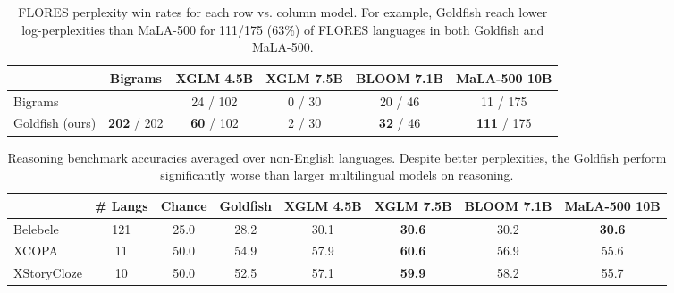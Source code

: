 \documentclass[11pt]{article}
\begin{document}
\setlength{\belowcaptionskip}{-0.1cm}
\begin{table}[t]
    \centering
    \footnotesize
    \renewcommand{\arraystretch}{1.3}
    \begin{tabular}{|p{2.0cm}|ccccc|}
        \cline{2-6}
        \multicolumn{1}{c|}{} &
        \multicolumn{1}{c|}{Bigrams} &
        \multicolumn{1}{c|}{XGLM 4.5B} &
        \multicolumn{1}{c|}{XGLM 7.5B} &
        \multicolumn{1}{c|}{BLOOM 7.1B} &
        \multicolumn{1}{c|}{MaLA-500 10B} \\ 
        \hline
        Bigrams & & 24 / 102 & 0 / 30 & 20 / 46 & 11 / 175 \\
        Goldfish (ours) & \textbf{202} / 202 & \textbf{60} / 102 & 2 / 30 & \textbf{32} / 46 & \textbf{111} / 175 \\
        \hline
    \end{tabular}
    \normalsize
    \caption{FLORES perplexity win rates for each row vs. column model. For example, Goldfish reach lower log-perplexities than MaLA-500 for 111/175 (63\%) of FLORES languages in both Goldfish and MaLA-500.}
    \label{tab:win-rates}
\end{table}
\setlength{\belowcaptionskip}{0cm}

\setlength{\belowcaptionskip}{-0.3cm}
\begin{table}[t]
    \centering
    \footnotesize
    \renewcommand{\arraystretch}{1.3}
    \begin{tabular}{|p{1.9cm}|c|cccccc|}
        \cline{2-8}
        \multicolumn{1}{c|}{} &
        \multicolumn{1}{c|}{\# Langs} &
        \multicolumn{1}{c|}{Chance} &
        \multicolumn{1}{c|}{Goldfish} &
        \multicolumn{1}{c|}{XGLM 4.5B} &
        \multicolumn{1}{c|}{XGLM 7.5B} &
        \multicolumn{1}{c|}{BLOOM 7.1B} &
        \multicolumn{1}{c|}{MaLA-500 10B} \\ 
        \hline
        Belebele & 121 & 25.0 & 28.2 & 30.1 & \textbf{30.6} & 30.2 & \textbf{30.6} \\
        XCOPA & 11 & 50.0 & 54.9 & 57.9 & \textbf{60.6} & 56.9 & 55.6 \\
        XStoryCloze & 10 & 50.0 & 52.5 & 57.1 & \textbf{59.9} & 58.2 & 55.7 \\
        \hline
    \end{tabular}
    \normalsize
    \caption{Reasoning benchmark accuracies averaged over non-English languages.
    Despite better perplexities, the Goldfish perform significantly worse than larger multilingual models on reasoning.
    }
    \label{tab:reasoning-results}
\end{table}
\setlength{\belowcaptionskip}{0cm}
\end{document}
